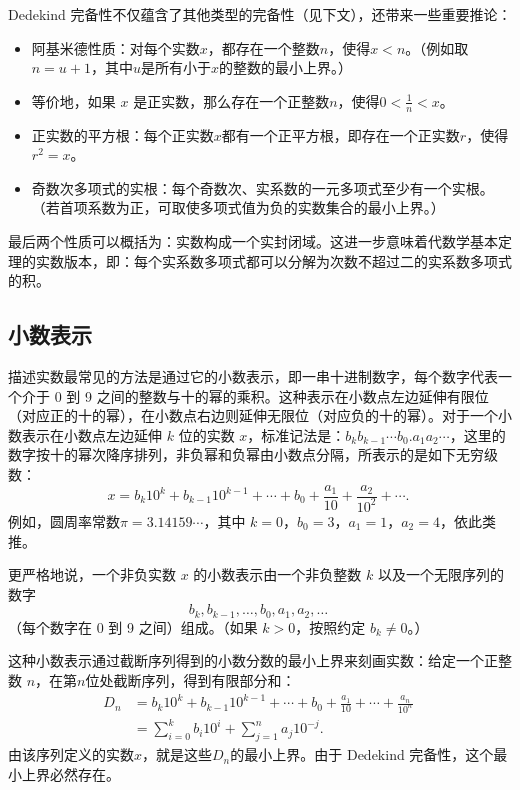 Dedekind 完备性不仅蕴含了其他类型的完备性（见下文），还带来一些重要推论：

\begin{itemize}
\item 阿基米德性质：对每个实数$x$，都存在一个整数$n$，使得$x<n$。（例如取 $n=u+1$，其中$u$是所有小于$x$的整数的最小上界。）
\item 等价地，如果 $x$ 是正实数，那么存在一个正整数$n$，使得$0<\tfrac{1}{n}<x$。
\item 正实数的平方根：每个正实数$x$都有一个正平方根，即存在一个正实数$r$，使得$r^{2}=x$。
\item 奇数次多项式的实根：每个奇数次、实系数的一元多项式至少有一个实根。（若首项系数为正，可取使多项式值为负的实数集合的最小上界。）
\end{itemize}
最后两个性质可以概括为：实数构成一个实封闭域。这进一步意味着代数学基本定理的实数版本，即：每个实系数多项式都可以分解为次数不超过二的实系数多项式的积。
\subsection{小数表示}
描述实数最常见的方法是通过它的小数表示，即一串十进制数字，每个数字代表一个介于 0 到 9 之间的整数与十的幂的乘积。这种表示在小数点左边延伸有限位（对应正的十的幂），在小数点右边则延伸无限位（对应负的十的幂）。对于一个小数表示在小数点左边延伸 $k$ 位的实数 $x$，标准记法是：$b_{k}b_{k-1}\cdots b_{0}.a_{1}a_{2}\cdots $，这里的数字按十的幂次降序排列，非负幂和负幂由小数点分隔，所表示的是如下无穷级数：
$$
x = b_{k}10^{k} + b_{k-1}10^{k-1} + \cdots + b_{0} + \frac{a_{1}}{10} + \frac{a_{2}}{10^{2}} + \cdots .~
$$
例如，圆周率常数$\pi = 3.14159\cdots$，其中 $k=0$，$b_{0}=3$，$a_{1}=1$，$a_{2}=4$，依此类推。

更严格地说，一个非负实数 $x$ 的小数表示由一个非负整数 $k$ 以及一个无限序列的数字
$$
b_{k}, b_{k-1}, \ldots , b_{0}, a_{1}, a_{2}, \ldots ~
$$
（每个数字在 0 到 9 之间）组成。（如果 $k>0$，按照约定 $b_{k} \neq 0$。）

这种小数表示通过截断序列得到的小数分数的最小上界来刻画实数：给定一个正整数 $n$，在第$n$位处截断序列，得到有限部分和：
$$
\begin{aligned}
D_{n} &= b_{k}10^{k} + b_{k-1}10^{k-1} + \cdots + b_{0} + \frac{a_{1}}{10} + \cdots + \frac{a_{n}}{10^{n}} \\
&= \sum_{i=0}^{k} b_{i}10^{i} + \sum_{j=1}^{n} a_{j}10^{-j}.
\end{aligned}~
$$
由该序列定义的实数$x$，就是这些$D_{n}$的最小上界。由于 Dedekind 完备性，这个最小上界必然存在。

